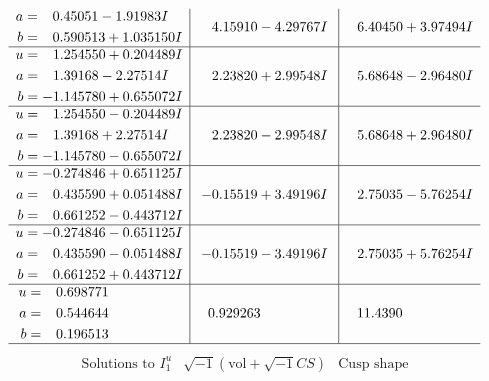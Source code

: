 \documentclass[1p]{elsarticle_modified}
\theoremstyle{definition}
\newcommand{\I}{\sqrt{-1}}
\begin{document}
$$\begin{array}{c|c|c}
\begin{aligned}
a &= \phantom{-}0.45051 - 1.91983 I \\
b &= \phantom{-}0.590513 + 1.035150 I\end{aligned}
 & \phantom{-}4.15910 - 4.29767 I & \phantom{-}6.40450 + 3.97494 I \\ \hline\begin{aligned}
u &= \phantom{-}1.254550 + 0.204489 I \\
a &= \phantom{-}1.39168 - 2.27514 I \\
b &= -1.145780 + 0.655072 I\end{aligned}
 & \phantom{-}2.23820 + 2.99548 I & \phantom{-}5.68648 - 2.96480 I \\ \hline\begin{aligned}
u &= \phantom{-}1.254550 - 0.204489 I \\
a &= \phantom{-}1.39168 + 2.27514 I \\
b &= -1.145780 - 0.655072 I\end{aligned}
 & \phantom{-}2.23820 - 2.99548 I & \phantom{-}5.68648 + 2.96480 I \\ \hline\begin{aligned}
u &= -0.274846 + 0.651125 I \\
a &= \phantom{-}0.435590 + 0.051488 I \\
b &= \phantom{-}0.661252 - 0.443712 I\end{aligned}
 & -0.15519 + 3.49196 I & \phantom{-}2.75035 - 5.76254 I \\ \hline\begin{aligned}
u &= -0.274846 - 0.651125 I \\
a &= \phantom{-}0.435590 - 0.051488 I \\
b &= \phantom{-}0.661252 + 0.443712 I\end{aligned}
 & -0.15519 - 3.49196 I & \phantom{-}2.75035 + 5.76254 I \\ \hline\begin{aligned}
u &= \phantom{-}0.698771\phantom{ +0.000000I} \\
a &= \phantom{-}0.544644\phantom{ +0.000000I} \\
b &= \phantom{-}0.196513\phantom{ +0.000000I}\end{aligned}
 & \phantom{-}0.929263\phantom{ +0.000000I} & \phantom{-}11.4390\phantom{ +0.000000I}\\
 \hline 
 \end{array}$$\newpage$$\begin{array}{c|c|c}  
\text{Solutions to }I^u_{1}& \I (\text{vol} + \sqrt{-1}CS) & \text{Cusp shape}\\

\end{array}$$
\end{document}
